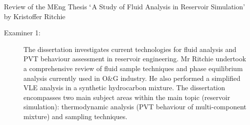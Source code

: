 \documentclass[14pt,twoside]{report}
\begin{document}
\clearpage



\bigskip

\begin{center}
  {\Large Review of the MEng Thesis $\lq$A Study of Fluid Analysis in Reservoir Simulation' by Kristoffer Ritchie}
\end{center}
\begin{description}
\item[Examiner 1:] The dissertation investigates current technologies for fluid analysis and PVT behaviour assessment in reservoir engineering. Mr Ritchie undertook a comprehensive review of fluid sample techniques and phase equilibrium analysis currently used in O$\&$G industry.  He also performed a simplified VLE analysis in a synthetic hydrocarbon mixture. The dissertation encompasses two main subject areas within the main topic (reservoir simulation): thermodynamic analysis (PVT behaviour of multi-component mixture) and sampling techniques. 


\end{description}
\end{document}
